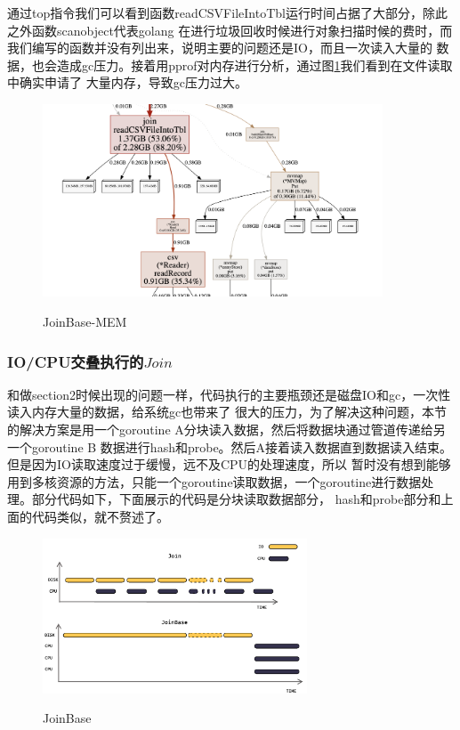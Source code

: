 \documentclass[UTF8]{ctexart}
\begin{document}
通过top指令我们可以看到函数readCSVFileIntoTbl运行时间占据了大部分，除此之外函数scanobject代表golang
在进行垃圾回收时候进行对象扫描时候的费时，而我们编写的函数并没有列出来，说明主要的问题还是IO，而且一次读入大量的
数据，也会造成gc压力。接着用pprof对内存进行分析，通过图\ref{joinbase-mem}我们看到在文件读取中确实申请了
大量内存，导致gc压力过大。

\begin{figure}[H]
  \centering
  \includegraphics[width=0.9\textwidth]{fig/base-mem.png}\\
  \caption{JoinBase-MEM}
  \label{joinbase-mem}
\end{figure}

\subsubsection{IO/CPU交叠执行的$Join$}
和做section2时候出现的问题一样，代码执行的主要瓶颈还是磁盘IO和gc，一次性读入内存大量的数据，给系统gc也带来了
很大的压力，为了解决这种问题，本节的解决方案是用一个goroutine A分块读入数据，然后将数据块通过管道传递给另一个goroutine B
数据进行hash和probe。然后A接着读入数据直到数据读入结束。但是因为IO读取速度过于缓慢，远不及CPU的处理速度，所以
暂时没有想到能够用到多核资源的方法，只能一个goroutine读取数据，一个goroutine进行数据处理。部分代码如下，下面展示的代码是分块读取数据部分，
hash和probe部分和上面的代码类似，就不赘述了。

\begin{figure}[H]
  \centering
  \includegraphics[width=0.7\textwidth]{fig/io.pdf}\\
  \caption{JoinBase}
  \label{join}
\end{figure}
\end{document}
